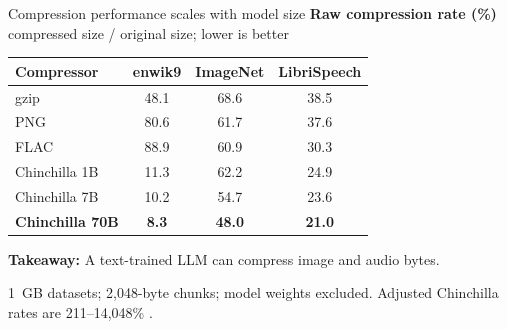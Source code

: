 \begin{frame}{Compression performance scales with model size}
  \centering
  \small
  \textbf{Raw compression rate (\%)} \quad compressed size / original size; lower is better

  \vspace{0.2em}
  \renewcommand{\arraystretch}{1.0}
  \setlength{\tabcolsep}{10pt}
  \begin{tabular}{lccc}
    \toprule
    \textbf{Compressor} & \textbf{enwik9} & \textbf{ImageNet} & \textbf{LibriSpeech} \\
    \midrule
    gzip            & 48.1 & 68.6 & 38.5 \\
    PNG             & 80.6 & 61.7 & 37.6 \\
    FLAC            & 88.9 & 60.9 & 30.3 \\
    \midrule
    Chinchilla 1B   & 11.3 & 62.2 & 24.9 \\
    Chinchilla 7B   & 10.2 & 54.7 & 23.6 \\
    \rowcolor{mDarkTeal!12}
    \textbf{Chinchilla 70B} & \textbf{8.3} & \textbf{48.0} & \textbf{21.0} \\
    \bottomrule
  \end{tabular}

  \vspace{0.2em}
  \footnotesize \textbf{\textcolor{mDarkTeal}{Takeaway:}} A text-trained LLM can compress image and audio bytes.

  \vspace{0.1em}
  \scriptsize 1~GB datasets; 2,048-byte chunks; model weights excluded. Adjusted Chinchilla rates are 211--14,048\% \parencite{deletangLanguageModelingCompression2024}.
\end{frame}

